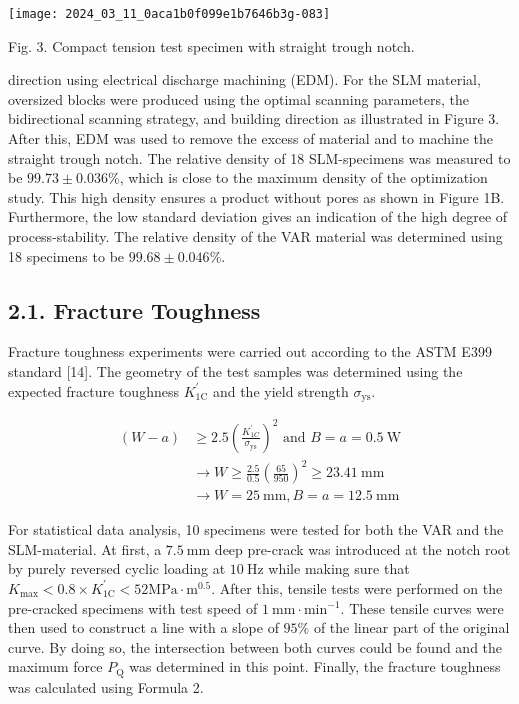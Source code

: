 \documentclass[10pt]{article}
\begin{document}
\begin{center}
\texttt{[image: 2024\_03\_11\_0aca1b0f099e1b7646b3g-083]}
\end{center}

Fig. 3. Compact tension test specimen with straight trough notch.

direction using electrical discharge machining (EDM). For the SLM material, oversized blocks were produced using the optimal scanning parameters, the bidirectional scanning strategy, and building direction as illustrated in Figure 3. After this, EDM was used to remove the excess of material and to machine the straight trough notch. The relative density of 18 SLM-specimens was measured to be $99.73 \pm 0.036 \%$, which is close to the maximum density of the optimization study. This high density ensures a product without pores as shown in Figure 1B. Furthermore, the low standard deviation gives an indication of the high degree of process-stability. The relative density of the VAR material was determined using 18 specimens to be $99.68 \pm 0.046 \%$.

\subsection*{2.1. Fracture Toughness}
Fracture toughness experiments were carried out according to the ASTM E399 standard [14]. The geometry of the test samples was determined using the expected fracture toughness $K_{1 \mathrm{C}}^{\prime}$ and the yield strength $\sigma_{\mathrm{ys}}$.


\begin{align*}
(W-a) & \geq 2.5\left(\frac{K_{1 C}^{\prime}}{\sigma_{\mathrm{ys}}}\right)^{2} \text { and } B=a=0.5 \mathrm{~W} \\
& \rightarrow W \geq \frac{2.5}{0.5}\left(\frac{65}{950}\right)^{2} \geq 23.41 \mathrm{~mm}  \tag{1}\\
& \rightarrow W=25 \mathrm{~mm}, B=a=12.5 \mathrm{~mm}
\end{align*}


For statistical data analysis, 10 specimens were tested for both the VAR and the SLM-material. At first, a $7.5 \mathrm{~mm}$ deep pre-crack was introduced at the notch root by purely reversed cyclic loading at $10 \mathrm{~Hz}$ while making sure that $K_{\max }<0.8 \times K_{1 \mathrm{C}}^{\prime}<52 \mathrm{MPa} \cdot \mathrm{m}^{0.5}$. After this, tensile tests were performed on the pre-cracked specimens with test speed of $1 \mathrm{~mm} \cdot \mathrm{min}^{-1}$. These tensile curves were then used to construct a line with a slope of $95 \%$ of the linear part of the original curve. By doing so, the intersection between both curves could be found and the maximum force $P_{\mathrm{Q}}$ was determined in this point. Finally, the fracture toughness was calculated using Formula 2.
\end{document}
